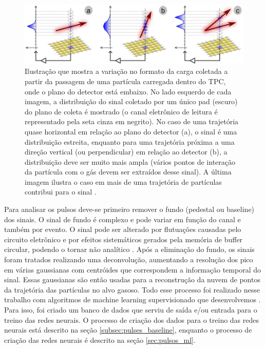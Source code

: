 \documentclass[a4paper,12pt,oneside]{book}
\begin{document}

\begin{figure}[H]
    \centering
    \includegraphics[scale = 0.29]{figs/get.png}
    \caption{Ilustração que mostra a variação no formato da carga coletada a partir da passagem de uma partícula carregada dentro do TPC, onde o plano do detector está embaixo. No lado esquerdo de cada imagem, a distribuição do sinal coletado por um único pad (escuro) do plano de coleta é mostrado (o canal eletrônico de leitura é representado pela seta cinza em negrito). No caso de uma trajetória quase horizontal em relação ao plano do detector (a), o sinal é uma distribuição estreita, enquanto para uma trajetória próxima a uma direção vertical (ou perpendicular) em relação ao detector (b), a distribuição deve ser muito mais ampla (vários pontos de interação da partícula com o gás devem ser extraídos desse sinal). A última imagem ilustra o caso em mais de uma trajetória de partículas contribui para o sinal \cite{GET}.}
    \label{fig:get_signal}
\end{figure}

\par Para analisar os pulsos deve-se primeiro remover o fundo (pedestal ou baseline) dos sinais. O sinal de fundo é complexo e pode variar em função do canal e também por evento. O sinal pode ser alterado por flutuações causadas pelo circuito eletrônico e por efeitos sistemáticos gerados pela memória de buffer circular, podendo o tornar não analítico \cite{FORTINO2022166497, GET}. Após a eliminação do fundo, os sinais foram tratados realizando uma deconvolução, aumentando a resolução dos pico em várias gaussianas com centróides que correspondem a informação temporal do sinal. Essas gaussianas são então usadas para a reconstrução da nuvem de pontos da trajetória das partículas no alvo gasoso. Todo esse processo foi realizado nesse trabalho com algoritmos de machine learning supervisionado que desenvolvemos \cite{FORTINO2022166497}. Para isso, foi criado um banco de dados que serviu de saída e/ou entrada para o treino das redes neurais. O processo de criação dos dados para o treino das redes neurais está descrito na seção \ref{subsec:pulses_baseline}, enquanto o processo de criação das redes neurais é descrito na seção \ref{sec:pulsos_ml}. 
\end{document}
